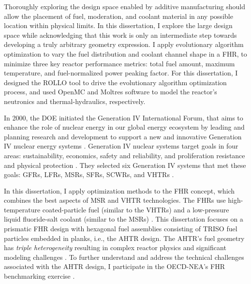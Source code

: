 Thoroughly exploring the design space enabled by additive manufacturing should allow 
the placement of fuel, moderation, and coolant material in any possible location 
within physical limits. 
In this dissertation, I explore the large design space while acknowledging that 
this work is only an intermediate step towards developing a truly arbitrary 
geometry expression. 
I apply evolutionary algorithm optimization to vary the fuel distribution and 
coolant channel shape in a \gls{FHR}, to minimize three key reactor performance 
metrics: total fuel amount, maximum temperature, and fuel-normalized power peaking 
factor. 
For this dissertation, I designed the \gls{ROLLO} tool \cite{chee_rollo_2021} to drive 
the evolutionary algorithm optimization process, and used OpenMC 
\cite{romano_openmc:_2015} and Moltres \cite{lindsay_introduction_2018} software to 
model the reactor's neutronics and thermal-hydraulics, respectively.  

In 2000, the \gls{DOE} initiated the Generation IV International Forum, that aims to 
enhance the role of nuclear energy in our global energy ecosystem by 
leading and planning research and development to support a new and innovative 
Generation IV nuclear energy systems \cite{gif_technology_2002}.
Generation IV nuclear systems target goals in four areas: sustainability, 
economics, safety and reliability, and proliferation resistance and physical 
protection \cite{gif_technology_2002}. 
They selected six Generation IV systems that met these goals: \glspl{GFR}, 
\glspl{LFR}, \glspl{MSR}, \glspl{SFR}, \glspl{SCWR}, and \glspl{VHTR} 
\cite{gif_technology_2002}. 

In this dissertation, I apply optimization methods to the \gls{FHR} concept, which 
combines the best aspects of \gls{MSR} and \gls{VHTR} technologies. 
The \glspl{FHR} use high-temperature coated-particle fuel (similar to the \glspl{VHTR}) 
and a low-pressure liquid fluoride-salt coolant (similar to the \glspl{MSR})
\cite{forsberg_fluoride-salt-cooled_2012,facilitators_fluoride-salt-cooled_2013}.
This dissertation focuses on a prismatic \gls{FHR} design with hexagonal fuel 
assemblies consisting of \gls{TRISO} fuel particles embedded in planks, i.e., 
the \gls{AHTR} design.
The \gls{AHTR}'s fuel geometry has \emph{triple heterogeneity} resulting in 
complex reactor physics and significant modeling challenges 
\cite{petrovic_benchmark_2021}. 
To further understand and address the technical challenges associated with the 
\gls{AHTR} design, I participate in the \gls{OECD}-\gls{NEA}'s \gls{FHR} 
benchmarking exercise \cite{petrovic_benchmark_2021}.

